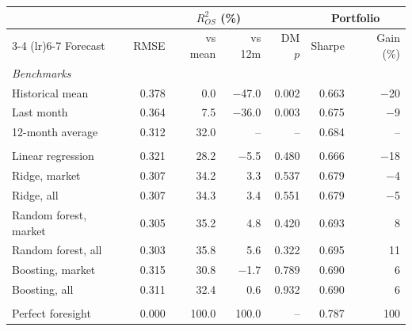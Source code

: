 \begin{tabular}{lrrrrrr}
\toprule
 &  & \multicolumn{2}{c}{$R^2_{OS}$ (\%)} &  & \multicolumn{2}{c}{Portfolio} \\
\cmidrule(lr){3-4} \cmidrule(lr){6-7}
Forecast & RMSE & vs mean & vs 12m & DM $p$ & Sharpe & Gain (\%) \\
\midrule
\multicolumn{7}{l}{\emph{Benchmarks}} \\
Historical mean & 0.378 & 0.0 & $-$47.0 & 0.002 & 0.663 & $-$20 \\
Last month & 0.364 & 7.5 & $-$36.0 & 0.003 & 0.675 & $-$9 \\
12-month average & 0.312 & 32.0 & -- & -- & 0.684 & -- \\
\addlinespace
\multicolumn{7}{l}{\emph{Models}} \\
Linear regression & 0.321 & 28.2 & $-$5.5 & 0.480 & 0.666 & $-$18 \\
Ridge, market & 0.307 & 34.2 & 3.3 & 0.537 & 0.679 & $-$4 \\
Ridge, all & 0.307 & 34.3 & 3.4 & 0.551 & 0.679 & $-$5 \\
Random forest, market & 0.305 & 35.2 & 4.8 & 0.420 & 0.693 & 8 \\
Random forest, all & 0.303 & 35.8 & 5.6 & 0.322 & 0.695 & 11 \\
Boosting, market & 0.315 & 30.8 & $-$1.7 & 0.789 & 0.690 & 6 \\
Boosting, all & 0.311 & 32.4 & 0.6 & 0.932 & 0.690 & 6 \\
\addlinespace
\multicolumn{7}{l}{\emph{Upper bound}} \\
Perfect foresight & 0.000 & 100.0 & 100.0 & -- & 0.787 & 100 \\
\bottomrule
\end{tabular}

